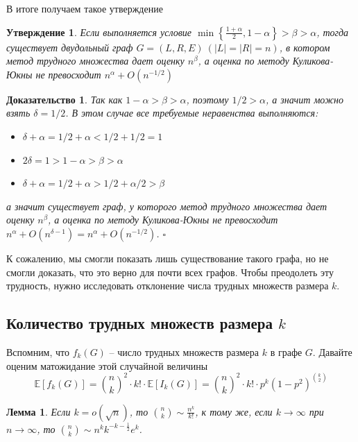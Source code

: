 \documentclass[a4paper]{article}
\newtheorem*{mclaim}{Утверждение}
\newtheorem*{mlemma}{Лемма}
\newtheorem*{msolution}{Доказательство}
\begin{document}
В итоге получаем такое утверждение 
\begin{mclaim}
    Если выполняется условие $\min\left\{\frac{1+\alpha}{2},1-\alpha\right\} > \beta > \alpha$, тогда 
    существует двудольный граф $G = (L, R, E)\ (|L| = |R| = n)$, в котором метод трудного множества 
    дает оценку $n^\beta$, а оценка по методу Куликова-Юкны не превосходит $n^\alpha + O(n^{-1/2})$
\end{mclaim}
\begin{msolution}
    Так как $1-\alpha > \beta > \alpha$, поэтому $1/2 > \alpha$, а значит можно взять $\delta = 1/2$. 
    В этом случае все требуемые неравенства выполняются:
    \begin{itemize}[noitemsep]
        \item $\delta + \alpha = 1/2 + \alpha < 1/2 + 1/2 = 1$
        \item $2\delta = 1 > 1 - \alpha > \beta > \alpha$
        \item $\delta + \alpha = 1/2 + \alpha > 1/2 + \alpha/2 > \beta$
    \end{itemize}
    а значит существует граф, у которого метод трудного множества дает оценку $n^{\beta}$, 
    а оценка по методу Куликова-Юкны не превосходит $n^\alpha + O(n^{\delta - 1}) = n^\alpha + O(n^{-1/2})$. $\square$

\end{msolution}


К сожалению, мы смогли показать лишь существование такого графа, но не смогли доказать, что это верно 
для почти всех графов. Чтобы преодолеть эту трудность, нужно исследовать отклонение числа трудных множеств 
размера $k$.

\subsection{Количество трудных множеств размера $k$}

Вспомним, что $f_k(G)$ -- число трудных множеств размера $k$ в графе $G$. Давайте оценим 
матожидание этой случайной величины $$\mathbb{E}[f_k(G)] = \binom{n}{k}^2\cdot k!\cdot \mathbb{E}[I_k(G)] = 
\binom{n}{k}^2\cdot k!\cdot p^k(1-p^2)^{\binom{k}{2}}$$

\begin{mlemma}
    Если $k = o(\sqrt{n})$, то $\binom{n}{k} \sim \frac{n^k}{k!}$, к тому же, если $k \rightarrow \infty$ 
    при $n \rightarrow \infty$, то $\binom{n}{k} \sim n^k k^{-k-\frac{1}{2}}e^k$.
\end{mlemma}
\end{document}
